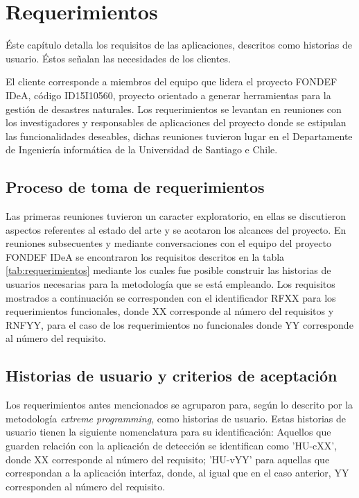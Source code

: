 \chapter{Requerimientos}
\label{cap:Requerimientos}

Éste capítulo detalla los requisitos de las aplicaciones, descritos como historias de usuario. Éstos señalan las necesidades de los clientes.

El cliente corresponde a miembros del equipo que lidera el proyecto FONDEF IDeA, código ID15I10560, proyecto orientado a generar herramientas para la gestión de desastres naturales. Los requerimientos se levantan en reuniones con los investigadores y responsables de aplicaciones del proyecto donde se estipulan las funcionalidades deseables, dichas reuniones tuvieron lugar en el Departamente de Ingeniería informática de la Universidad de Santiago e Chile.

\section{Proceso de toma de requerimientos}
\label{sec:tomaDeRequerimientos}

Las primeras reuniones tuvieron un caracter exploratorio, en ellas se discutieron aspectos referentes al estado del arte y se acotaron los alcances del proyecto. En reuniones subsecuentes y mediante conversaciones con el equipo del proyecto FONDEF IDeA se encontraron los requisitos descritos en la tabla \ref{tab:requerimientos} mediante los cuales fue posible construir las historias de usuarios necesarias para la metodología que se está empleando. Los requisitos mostrados a continuación se corresponden con el identificador RFXX para los requerimientos funcionales, donde XX corresponde al número del requisitos y RNFYY, para el caso de los requerimientos no funcionales donde YY corresponde al número del requisito.

\section{Historias de usuario y criterios de aceptación}
\label{sec:historias}

Los requerimientos antes mencionados se agruparon para, según lo descrito por la metodología \textit{extreme programming}, como historias de usuario. Estas historias de usuario tienen la siguiente nomenclatura para su identificación: Aquellos que guarden relación con la aplicación de detección se identifican como 'HU-cXX', donde XX corresponde al número del requisito; 'HU-vYY' para aquellas que correspondan a la aplicación interfaz, donde, al igual que en el caso anterior, YY corresponden al número del requisito.

